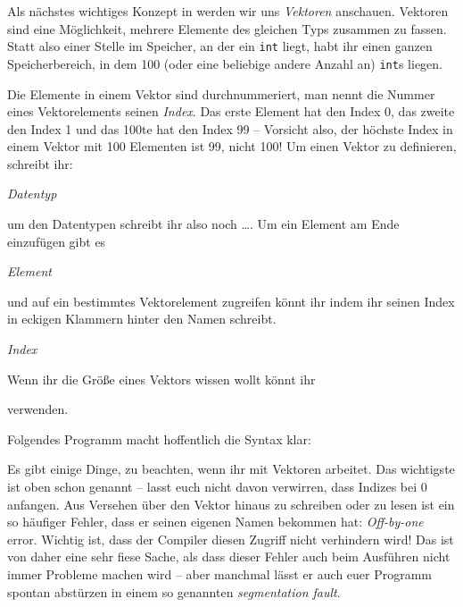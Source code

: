 
Als nächstes wichtiges Konzept in \Cpp werden wir uns \emph{Vektoren} anschauen.
Vektoren sind eine Möglichkeit, mehrere Elemente des gleichen Typs zusammen zu fassen.
Statt also einer Stelle im Speicher, an der ein \texttt{int} liegt, habt ihr einen ganzen Speicherbereich, in dem 100 (oder eine beliebige andere Anzahl an) \texttt{int}s liegen.

Die Elemente in einem Vektor sind durchnummeriert, man nennt die Nummer eines Vektorelements seinen \emph{Index}.
Das erste Element hat den Index 0, das zweite den Index 1 und das 100te hat den Index 99 -- Vorsicht also, der höchste Index in einem Vektor mit 100 Elementen ist 99, nicht 100!
Um einen Vektor zu definieren, schreibt ihr:
\begin{center}
\emph{Datentyp}
\end{center}
um den Datentypen schreibt ihr also noch \dots\cppinline{>}.
Um ein Element am Ende einzufügen gibt es
\begin{center}
\emph{Element}\cppinline{);}
\end{center}
und auf ein bestimmtes Vektorelement zugreifen könnt ihr indem ihr seinen Index in eckigen Klammern hinter den Namen schreibt.
\begin{center}
\cppinline{einvektor[}\emph{Index}\cppinline{]}
\end{center}
Wenn ihr die Größe eines Vektors wissen wollt könnt ihr
\begin{center}
\end{center}
verwenden.

Folgendes Programm macht hoffentlich die Syntax klar:


Es gibt einige Dinge, zu beachten, wenn ihr mit Vektoren arbeitet.
Das wichtigste ist oben schon genannt -- lasst euch nicht davon verwirren, dass Indizes bei 0 anfangen.
Aus Versehen über den Vektor hinaus zu schreiben oder zu lesen ist ein so häufiger Fehler, dass er seinen eigenen Namen bekommen hat: \emph{Off-by-one} error.
Wichtig ist, dass der Compiler diesen Zugriff nicht verhindern wird!
Das ist von daher eine sehr fiese Sache, als dass dieser Fehler auch beim Ausführen nicht immer Probleme machen wird -- aber manchmal lässt er auch euer Programm spontan abstürzen in einem so genannten \emph{segmentation fault}.

